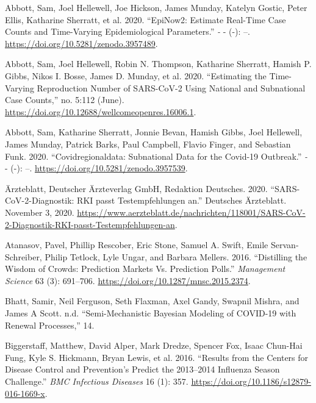 \documentclass[
]{article}
\newlength{\cslhangindent}
\newlength{\cslentryspacingunit} %
\newenvironment{CSLReferences}[2] %
 {%
  \setlength{\parindent}{0pt}
  \ifodd #1
  \let\oldpar\par
  \def\par{\hangindent=\cslhangindent\oldpar}
  \fi
  \setlength{\parskip}{#2\cslentryspacingunit}
 }%
 {}
\begin{document}
\hypertarget{refs}{}
\begin{CSLReferences}{1}{0}
\leavevmode{}%
Abbott, Sam, Joel Hellewell, Joe Hickson, James Munday, Katelyn Gostic, Peter Ellis, Katharine Sherratt, et al. 2020. {``EpiNow2: Estimate Real-Time Case Counts and Time-Varying Epidemiological Parameters.''} \emph{-} - (-): --. \url{https://doi.org/10.5281/zenodo.3957489}.

\leavevmode{}%
Abbott, Sam, Joel Hellewell, Robin N. Thompson, Katharine Sherratt, Hamish P. Gibbs, Nikos I. Bosse, James D. Munday, et al. 2020. {``Estimating the Time-Varying Reproduction Number of {SARS}-{CoV}-2 Using National and Subnational Case Counts,''} no. 5:112 (June). \url{https://doi.org/10.12688/wellcomeopenres.16006.1}.

\leavevmode{}%
Abbott, Sam, Katharine Sherratt, Jonnie Bevan, Hamish Gibbs, Joel Hellewell, James Munday, Patrick Barks, Paul Campbell, Flavio Finger, and Sebastian Funk. 2020. {``Covidregionaldata: Subnational Data for the Covid-19 Outbreak.''} \emph{-} - (-): --. \url{https://doi.org/10.5281/zenodo.3957539}.

\leavevmode{}%
Ärzteblatt, Deutscher Ärzteverlag GmbH, Redaktion Deutsches. 2020. {``SARS-CoV-2-Diagnostik: RKI passt Testempfehlungen an.''} {Deutsches Ärzteblatt}. November 3, 2020. \url{https://www.aerzteblatt.de/nachrichten/118001/SARS-CoV-2-Diagnostik-RKI-passt-Testempfehlungen-an}.

\leavevmode{}%
Atanasov, Pavel, Phillip Rescober, Eric Stone, Samuel A. Swift, Emile Servan-Schreiber, Philip Tetlock, Lyle Ungar, and Barbara Mellers. 2016. {``Distilling the {Wisdom} of {Crowds}: Prediction {Markets} Vs. {Prediction Polls}.''} \emph{Management Science} 63 (3): 691--706. \url{https://doi.org/10.1287/mnsc.2015.2374}.

\leavevmode{}%
Bhatt, Samir, Neil Ferguson, Seth Flaxman, Axel Gandy, Swapnil Mishra, and James A Scott. n.d. {``Semi-{Mechanistic Bayesian} Modeling of {COVID}-19 with {Renewal Processes},''} 14.

\leavevmode{}%
Biggerstaff, Matthew, David Alper, Mark Dredze, Spencer Fox, Isaac Chun-Hai Fung, Kyle S. Hickmann, Bryan Lewis, et al. 2016. {``Results from the Centers for Disease Control and Prevention's Predict the 2013--2014 {Influenza Season Challenge}.''} \emph{BMC Infectious Diseases} 16 (1): 357. \url{https://doi.org/10.1186/s12879-016-1669-x}.


\end{CSLReferences}
\end{document}

